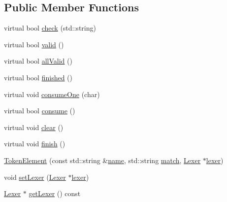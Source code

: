 \subsection*{Public Member Functions}
\begin{DoxyCompactItemize}
\item 
virtual bool \mbox{\hyperlink{class_erable_1_1_compiler_1_1_token_element_a939f70ed141904d769b6d9f6ecf39cb1}{check}} (std\+::string)
\item 
virtual bool \mbox{\hyperlink{class_erable_1_1_compiler_1_1_token_element_ae44f30672bda981ba9b7aeabe671dc45}{valid}} ()
\item 
virtual bool \mbox{\hyperlink{class_erable_1_1_compiler_1_1_token_element_a3bd660d6f4e84de06d1b0451839183da}{all\+Valid}} ()
\item 
virtual bool \mbox{\hyperlink{class_erable_1_1_compiler_1_1_token_element_a1ff3e31b4064cd22463c91130a819646}{finished}} ()
\item 
virtual void \mbox{\hyperlink{class_erable_1_1_compiler_1_1_token_element_a36d20884e5ba6cfa46fcd28711be9589}{consume\+One}} (char)
\item 
virtual bool \mbox{\hyperlink{class_erable_1_1_compiler_1_1_token_element_af86a746034d9c4bcdcaf7c3b6cd66ad3}{consume}} ()
\item 
virtual void \mbox{\hyperlink{class_erable_1_1_compiler_1_1_token_element_a87d2fb14a2920a914fb5aee33324ab9a}{clear}} ()
\item 
virtual void \mbox{\hyperlink{class_erable_1_1_compiler_1_1_token_element_a481e4deb721a1a5f435ee27f850cdf81}{finish}} ()
\item 
\mbox{\hyperlink{class_erable_1_1_compiler_1_1_token_element_a521930111d7024e1859cd53d215b3b92}{Token\+Element}} (const std\+::string \&\mbox{\hyperlink{class_erable_1_1_compiler_1_1_token_element_aeeb8454fbc160978c6fcb27b77ff9d90}{name}}, std\+::string \mbox{\hyperlink{class_erable_1_1_compiler_1_1_token_element_acae3d5d6e860524271a0f164bbd25d83}{match}}, \mbox{\hyperlink{class_lexer}{Lexer}} $\ast$\mbox{\hyperlink{class_erable_1_1_compiler_1_1_token_element_a81c49facfd93dd67f5afeb4bfe305e3a}{lexer}})
\item 
void \mbox{\hyperlink{class_erable_1_1_compiler_1_1_token_element_a217286fcdf9b0c2ae7182cd0b47b0a07}{set\+Lexer}} (\mbox{\hyperlink{class_lexer}{Lexer}} $\ast$\mbox{\hyperlink{class_erable_1_1_compiler_1_1_token_element_a81c49facfd93dd67f5afeb4bfe305e3a}{lexer}})
\item 
\mbox{\hyperlink{class_lexer}{Lexer}} $\ast$ \mbox{\hyperlink{class_erable_1_1_compiler_1_1_token_element_a4f68c60a360c804791eac6f6926f0d5f}{get\+Lexer}} () const

\end{DoxyCompactItemize}
